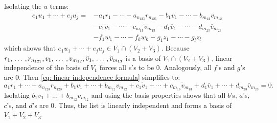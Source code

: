 \begin{failedattempt}
  Isolating the $u$ terms:
  \[
  \begin{aligned}
    e_{1} u_1 + \cdots + e_j u_j = &- a_1r_1 -  \cdots - a_{n_{123}} r_{n_{123}} - b_1v_1 -  \cdots - b_{m_{12}} v_{m_{12}} \\
    &-  c_1\widetilde{v}_1 - \cdots - c_{m_{13}}\widetilde{v}_{m_{13}} - d_{1}\overline{v}_1 - \cdots - d_{m_{23}}\overline{v}_{m_{23}} \\
    &  - f_1 w_1 - \cdots - f_k w_k - g_1 z_1 - \cdots - g_l z_l
  \end{aligned}
  \]
  which shows that $e_{1} u_1 + \cdots + e_j u_j \in V_1 \cap (V_2 + V_3)$.
  Because $r_{1}, {\, \ldots \,\,}, r_{n_{123}}, v_{1}, {\, \ldots \,\,}, v_{m_{12}}, \widetilde{v}_1, {\, \ldots \,\,}, \widetilde{v}_{m_{13}}$ is a basis of $V_1 \cap (V_2+V_3)$,
  linear independence of the basis of $V_1$ forces all $e$'s to be $0$.
  Analogously, all $f$'s and $g$'s are $0$.
  Then \eqref{eq: linear independence formula} simplifies to:
  \begin{equation}
    \label{eq: second linear independence formula}
    a_1r_1 +  \cdots + a_{n_{123}} r_{n_{123}} + b_1v_1 +  \cdots + b_{m_{12}} v_{m_{12}} +  c_1\widetilde{v}_1 + \cdots + c_{m_{13}}\widetilde{v}_{m_{13}} + d_{1}\overline{v}_1 + \cdots + d_{m_{23}}\overline{v}_{m_{23}} = 0.
  \end{equation}
  Isolating $b_1 v_1 + \dots + b_{m_{12}} v_{m_{12}}$ and using the basis properties shows that all $b$'s, $a$'s, $c$'s, and $d$'s are $0$.
  Thus, the list is linearly independent and forms a basis of $V_1 + V_2 + V_3$.
\end{failedattempt}

